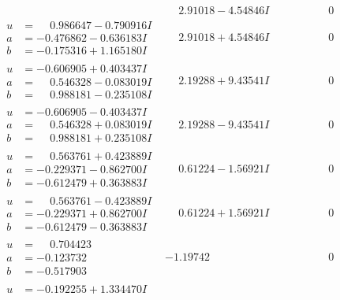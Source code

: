 \documentclass[1p]{elsarticle_modified}
\theoremstyle{definition}
\begin{document}
$$\begin{array}{c|c|c}
 & \phantom{-}2.91018 - 4.54846 I & \phantom{-0.000000 } 0 \\ \hline\begin{aligned}
u &= \phantom{-}0.986647 - 0.790916 I \\
a &= -0.476862 - 0.636183 I \\
b &= -0.175316 + 1.165180 I\end{aligned}
 & \phantom{-}2.91018 + 4.54846 I & \phantom{-0.000000 } 0 \\ \hline\begin{aligned}
u &= -0.606905 + 0.403437 I \\
a &= \phantom{-}0.546328 - 0.083019 I \\
b &= \phantom{-}0.988181 - 0.235108 I\end{aligned}
 & \phantom{-}2.19288 + 9.43541 I & \phantom{-0.000000 } 0 \\ \hline\begin{aligned}
u &= -0.606905 - 0.403437 I \\
a &= \phantom{-}0.546328 + 0.083019 I \\
b &= \phantom{-}0.988181 + 0.235108 I\end{aligned}
 & \phantom{-}2.19288 - 9.43541 I & \phantom{-0.000000 } 0 \\ \hline\begin{aligned}
u &= \phantom{-}0.563761 + 0.423889 I \\
a &= -0.229371 - 0.862700 I \\
b &= -0.612479 + 0.363883 I\end{aligned}
 & \phantom{-}0.61224 - 1.56921 I & \phantom{-0.000000 } 0 \\ \hline\begin{aligned}
u &= \phantom{-}0.563761 - 0.423889 I \\
a &= -0.229371 + 0.862700 I \\
b &= -0.612479 - 0.363883 I\end{aligned}
 & \phantom{-}0.61224 + 1.56921 I & \phantom{-0.000000 } 0 \\ \hline\begin{aligned}
u &= \phantom{-}0.704423\phantom{ +0.000000I} \\
a &= -0.123732\phantom{ +0.000000I} \\
b &= -0.517903\phantom{ +0.000000I}\end{aligned}
 & -1.19742\phantom{ +0.000000I} & \phantom{-0.000000 } 0 \\ \hline\begin{aligned}
u &= -0.192255 + 1.334470 I \\

\end{aligned}
\end{array}$$
\end{document}
